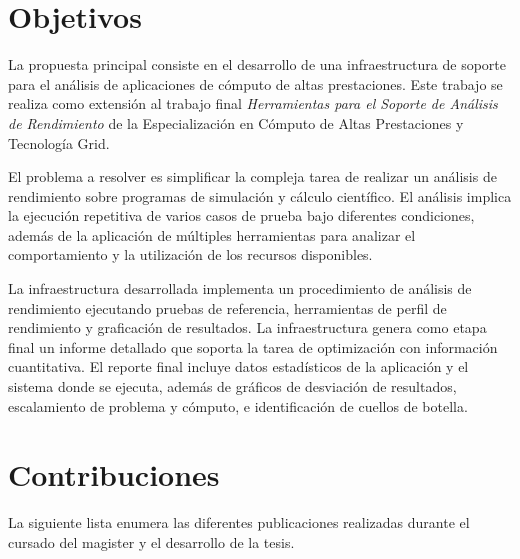 \documentclass[a4paper]{report}
\begin{document}
\section{Objetivos}

La propuesta principal consiste en el desarrollo de una infraestructura de soporte para el análisis de aplicaciones de cómputo de altas prestaciones.
Este trabajo se realiza como extensión al trabajo final {\it Herramientas para el Soporte de Análisis de Rendimiento} de la Especialización en Cómputo de Altas Prestaciones y Tecnología Grid.

\bigskip

El problema a resolver es simplificar la compleja tarea de realizar un análisis de rendimiento sobre programas de simulación y cálculo científico. El análisis implica la ejecución repetitiva
de varios casos de prueba bajo diferentes condiciones, además de la aplicación de múltiples herramientas para analizar el comportamiento y la utilización de los recursos disponibles.

\bigskip

La infraestructura desarrollada implementa un procedimiento de análisis de rendimiento ejecutando pruebas de referencia, herramientas de perfil de rendimiento y graficación de resultados.
La infraestructura genera como etapa final un informe detallado que soporta la tarea de optimización con información cuantitativa.
El reporte final incluye datos estadísticos de la aplicación y el sistema donde se ejecuta, además de gráficos de desviación de resultados, escalamiento de problema y cómputo, e identificación
de cuellos de botella.

\section{Contribuciones}

La siguiente lista enumera las diferentes publicaciones realizadas durante el cursado del magister y el desarrollo de la tesis.
\end{document}
